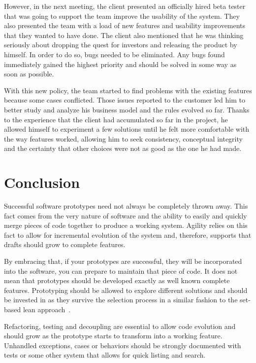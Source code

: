 \documentclass[lnbip]{svmultln}
\begin{document}
However, in the next meeting, the client presented an officially hired
beta tester that was going to support the team improve the usability
of the system. They also presented the team with a load of new
features and usability improvements that they wanted to have done. The
client also mentioned that he was thinking seriously about dropping the
quest for investors and releasing the product by himself. In order to
do so, bugs needed to be eliminated. Any bugs found immediately gained
the highest priority and should be solved in some way as soon as
possible.

With this new policy, the team started to find problems with the
existing features because some cases conflicted. Those issues reported
to the customer led him to better study and analyze his business model and
the rules evolved so far. Thanks to the experience that the client had
accumulated so far in the project, he allowed himself to experiment a
few solutions until he felt more comfortable with the way features
worked, allowing him to seek consistency, conceptual integrity and the
certainty that other choices were not as good as the one he had made.

\section{Conclusion}
\label{sec:conclusion}

Successful software prototypes need not always be completely thrown
away. This fact comes from the very nature of software and the ability
to easily and quickly merge pieces of code together to produce a
working system. Agility relies on this fact to allow for incremental
evolution of the system and, therefore, supports that drafts should
grow to complete features.

By embracing that, if your prototypes are successful, they will be
incorporated into the software, you can prepare to maintain that piece
of code. It does not mean that prototypes should be developed exactly
as well known complete features. Prototyping should be allowed to
explore different solutions and should be invested in as they survive
the selection process in a similar fashion to the set-based lean
approach~\cite{Poppendieck2009}.

Refactoring, testing and decoupling are essential to allow code
evolution and should grow as the prototype starts to transform into a
working feature. Unhandled exceptions, cases or behaviors should be
strongly documented with tests or some other system that allows for
quick listing and search.
\end{document}
